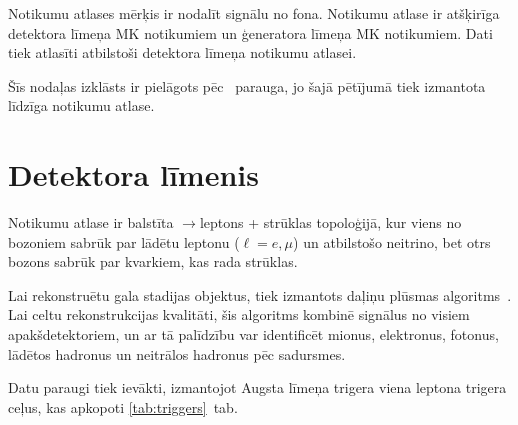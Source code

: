 Notikumu atlases mērķis ir nodalīt signālu no fona. Notikumu atlase ir atšķirīga detektora līmeņa MK notikumiem un ģeneratora līmeņa MK notikumiem. Dati tiek atlasīti atbilstoši detektora līmeņa notikumu atlasei.

Šīs nodaļas izklāsts ir pielāgots pēc~\cite{CMS-AN-2017-159} parauga, jo šajā pētījumā tiek izmantota līdzīga notikumu atlase.

\section{Detektora līmenis}
\label{sec:detector_level}

Notikumu atlase ir balstīta \ttbar$\to$leptons + strūklas topoloģijā, kur viens no \PW bozoniem sabrūk par lādētu leptonu ($\ell=e, \mu$) un atbilstošo neitrino, bet otrs \PW bozons sabrūk par kvarkiem, kas rada strūklas.

Lai rekonstruētu gala stadijas objektus, tiek izmantots daļiņu plūsmas algoritms~\cite{Sirunyan:2017ulk}. Lai celtu rekonstrukcijas kvalitāti, šis algoritms kombinē signālus no visiem apakšdetektoriem, un ar tā palīdzību var identificēt mionus, elektronus, fotonus, lādētos hadronus un neitrālos hadronus pēc \Pp\Pp sadursmes.

Datu paraugi tiek ievākti, izmantojot \gls{Augsta līmeņa trigera} viena leptona trigera ceļus, kas apkopoti \ref{tab:triggers}~tab.

